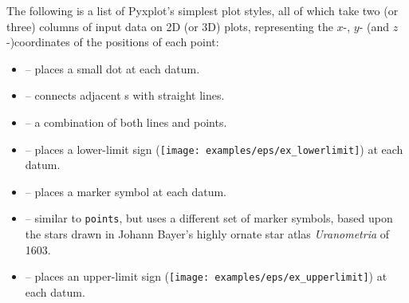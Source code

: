 The following is a list of Pyxplot's simplest plot styles, all of which take
two (or three) columns of input data on 2D (or 3D) plots, representing the
$x$-, $y$- (and $z$-)coordinates of the positions of each point:
\begin{itemize}
\item {} -- places a small dot at each datum.
\item {} -- connects adjacent \datapoint s with straight lines.
\item {} -- a combination of both lines and points.
\item {} -- places a lower-limit sign (\texttt{[image: examples/eps/ex\_lowerlimit]}) at each datum.
\item {} -- places a marker symbol at each datum.
\item {} -- similar to {\tt points}, but uses a different set of marker symbols, based upon the stars drawn in Johann Bayer's highly ornate star atlas {\it Uranometria} of 1603.
\item {} -- places an upper-limit sign (\texttt{[image: examples/eps/ex\_upperlimit]}) at each datum.
\end{itemize}

